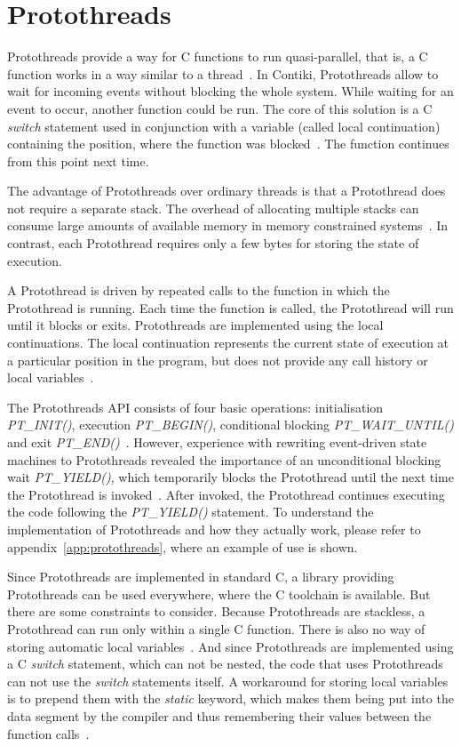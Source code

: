 
\section{Protothreads}\label{sec:contiki-protothreads}
Protothreads provide a way for C functions to run quasi-parallel,
that is, a C function works in a way similar to a thread~\cite{paper-protothreads}.
In Contiki, Protothreads allow to wait for incoming events without blocking the whole system.
While waiting for an event to occur, another function could be run.
The core of this solution is a C {\it switch} statement used in conjunction with a variable (called local continuation)
containing the position, where the function was blocked~\cite{paper-protothreads}.
The function continues from this point next time.

The advantage of Protothreads over ordinary threads is that a Protothread does not require a separate stack.
The overhead of allocating multiple stacks can consume large amounts of
available memory in memory constrained systems~\cite{paper-protothreads}.
In contrast, each Protothread requires only a few bytes for storing the state of execution.

A Protothread is driven by repeated calls to the function in which the Protothread is running.
Each time the function is called, the Protothread will run until it blocks or exits.
Protothreads are implemented using the local continuations. The local continuation represents the current state
of execution at a particular position in the program, but does not provide any call history or local variables~\cite{contiki-docs}.

The Protothreads API consists of four basic operations: initialisation {\it{PT\_INIT()}}, execution {\it{PT\_BEGIN()}},
conditional blocking {\it{PT\_WAIT\_UNTIL()}} and exit {\it{PT\_END()}}~\cite{paper-protothreads}.
However, experience with rewriting event-driven state machines to Protothreads revealed
the importance of an unconditional blocking wait {\it{PT\_YIELD()}},
which temporarily blocks the Protothread until the next time the Protothread is invoked~\cite{thesis-programming}.
After invoked, the Protothread continues executing the code following the {\it{PT\_YIELD()}} statement.
To understand the implementation of Protothreads and how they actually work,
please refer to appendix~\ref{app:protothreads}, where an example of use is shown.

Since Protothreads are implemented in standard C, a library providing Protothreads can be used everywhere,
where the C toolchain is available.
But there are some constraints to consider.
Because Protothreads are stackless, a Protothread can run only within a single C function.
There is also no way of storing automatic local variables~\cite{contiki-docs}.
And since Protothreads are implemented using a C {\it switch} statement, which can
not be nested, the code that uses Protothreads can not use the {\it switch} statements itself.
A workaround for storing local variables is to prepend them with the {\it static} keyword,
which makes them being put into the data segment
by the compiler and thus remembering their values between the function calls~\cite{paper-protothreads}.
